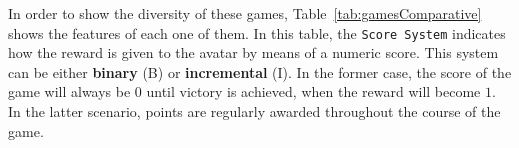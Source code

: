 \documentclass[conference]{IEEEtran}
\begin{document}

In order to show the diversity of these games, Table~\ref{tab:gamesComparative} shows the features of each one of them. In this table, the \texttt{Score System} indicates how the reward is given to the avatar by means of a numeric score. This system can be either \textbf{binary} (B) or \textbf{incremental} (I). In the former case, the score of the game will always be $0$ until victory is achieved, when the reward will become $1$. In the latter scenario, points are regularly awarded throughout the course of the game.
\end{document}
